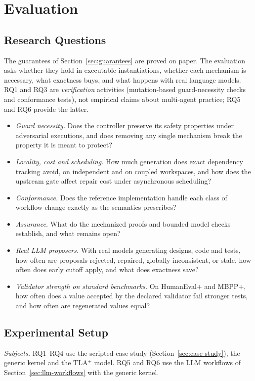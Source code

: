 \section{Evaluation}\label{sec:evaluation}

\subsection{Research Questions}
The guarantees of Section~\ref{sec:guarantees} are proved on paper. The evaluation asks whether they hold in executable instantiations, whether each mechanism is necessary, what exactness buys, and what happens with real language models. RQ1 and RQ3 are \emph{verification} activities (mutation-based guard-necessity checks and conformance tests), not empirical claims about multi-agent practice; RQ5 and RQ6 provide the latter.
\begin{itemize}
\item[\RQ{1}] \emph{Guard necessity.} Does the controller preserve its safety properties under adversarial executions, and does removing any single mechanism break the property it is meant to protect?
\item[\RQ{2}] \emph{Locality, cost and scheduling.} How much generation does exact dependency tracking avoid, on independent and on coupled workspaces, and how does the upstream gate affect repair cost under asynchronous scheduling?
\item[\RQ{3}] \emph{Conformance.} Does the reference implementation handle each class of workflow change exactly as the semantics prescribes?
\item[\RQ{4}] \emph{Assurance.} What do the mechanized proofs and bounded model checks establish, and what remains open?
\item[\RQ{5}] \emph{Real LLM proposers.} With real models generating designs, code and tests, how often are proposals rejected, repaired, globally inconsistent, or stale, how often does early cutoff apply, and what does exactness save?
\item[\RQ{6}] \emph{Validator strength on standard benchmarks.} On HumanEval+ and MBPP+, how often does a value accepted by the declared validator fail stronger tests, and how often are regenerated values equal?
\end{itemize}

\subsection{Experimental Setup}
\emph{Subjects.} RQ1--RQ4 use the scripted case study (Section~\ref{sec:case-study}), the generic kernel and the TLA$^+$ model. RQ5 and RQ6 use the LLM workflows of Section~\ref{sec:llm-workflows} with the generic kernel.

